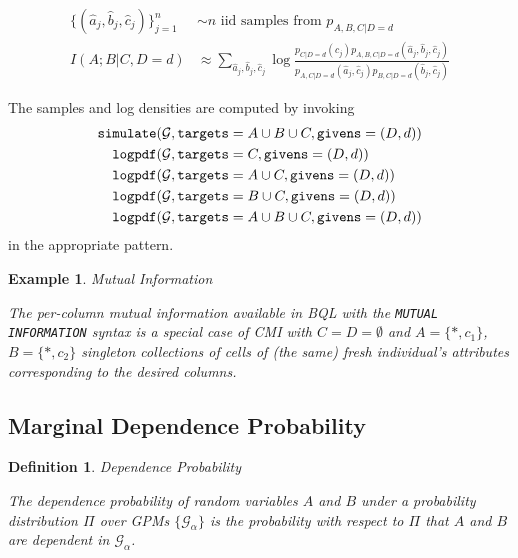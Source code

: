 \documentclass[10pt,letterpaper]{article}
\newtheorem{example}{Example}[section]
\newtheorem{definition}{Definition}[section]
\newcommand{\set}[1]{\{#1\}}
\newcommand{\G}{\mathcal{G}}
\begin{document}
    \begin{align*}
    \set{(\hat{a}_j,\hat{b}_j,\hat{c}_j)}_{j=1}^n & \sim n \textrm{ iid samples from } p_{A,B,C|D=d} \\
    I(A;B|C,D=d) & \approx
        \sum_{\hat{a}_j,\hat{b}_j,\hat{c}_j} \log
         \frac{p_{C|D=d}(\hat{c}_j)
         p_{A,B,C|D=d}(\hat{a}_j,\hat{b}_j,\hat{c}_j)}
         {p_{A,C|D=d}(\hat{a}_j,\hat{c}_j) p_{B,C|D=d}(\hat{b}_j,\hat{c}_j)}
    \end{align*}

    The samples and log densities are computed by invoking
    \begin{align*}
    {\tt simulate}&(\G, {\tt targets} = A \cup B \cup C, {\tt givens} = (D, d)) \\
    {\tt logpdf}&(\G, {\tt targets} = C, {\tt givens} = (D, d)) \\
    {\tt logpdf}&(\G, {\tt targets} = A \cup C, {\tt givens} = (D, d)) \\
    {\tt logpdf}&(\G, {\tt targets} = B \cup C, {\tt givens} = (D, d)) \\
    {\tt logpdf}&(\G, {\tt targets} = A \cup B \cup C, {\tt givens} = (D, d))
    \end{align*}
    in the appropriate pattern.


\begin{example} Mutual Information

The per-column mutual information available in BQL with the
\texttt{MUTUAL INFORMATION} syntax is a special case of CMI with
$C = D = \emptyset$ and $A = \set{*, c_1}$, $B = \set{*, c_2}$
singleton collections of cells of (the same) fresh individual's
attributes corresponding to the desired columns.
\end{example}

\subsection{Marginal Dependence Probability}

\begin{definition} Dependence Probability
\label{def:dep-prob}

The \emph{dependence probability} of random variables $A$ and $B$
under a probability distribution $\Pi$ over GPMs $\set{\G_\alpha}$
is the probability with respect to $\Pi$ that $A$ and $B$ are
dependent in $\G_\alpha$.
\end{definition}
\end{document}
